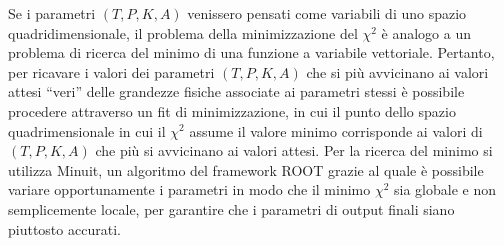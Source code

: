 \documentclass[12pt,a4paper,twoside]{report}
\begin{document}
	Se i parametri $\left(T,P,K,A\right)$ venissero pensati come variabili di uno spazio quadridimensionale, il problema della minimizzazione del $\chi^2$ è analogo a un problema di ricerca del minimo di una funzione a variabile vettoriale. Pertanto, per ricavare i valori dei parametri $\left(T,P,K,A\right)$ che si più avvicinano ai valori attesi ``veri'' delle grandezze fisiche associate ai parametri stessi è possibile procedere attraverso un fit di minimizzazione, in cui il punto dello spazio quadrimensionale in cui il $\chi^2$ assume il valore minimo corrisponde ai valori di $\left(T,P,K,A\right)$ che più si avvicinano ai valori attesi. Per la ricerca del minimo si utilizza Minuit, un algoritmo del framework ROOT grazie al quale è possibile variare opportunamente i parametri in modo che il minimo $\chi^2$ sia globale e non semplicemente locale, per garantire che i parametri di output finali siano piuttosto accurati.
	
\end{document}
